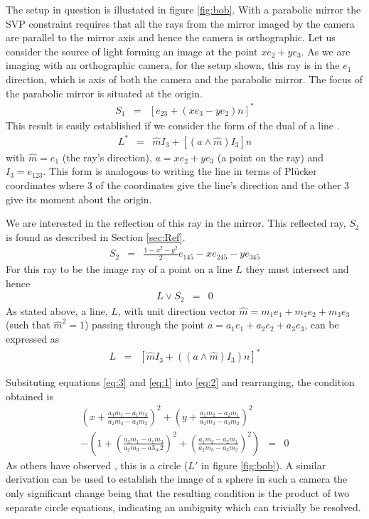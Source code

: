 The setup in question is illustated in figure \ref{fig:bob}. With a parabolic
mirror the SVP constraint requires that all the rays from the mirror imaged by
the camera are parallel to the mirror axis and hence the camera is
orthographic. Let us consider the source of light forming an image at the point
$xe_2 + ye_3$.  As we are imaging with an orthographic camera, for the setup
shown, this ray is in the $e_1$ direction, which is axis of both the camera and the parabolic mirror.  The focus of the parabolic mirror is situated at the origin. 
\begin{eqnarray}  
S_1&=& \left[e_{23} + (xe_3 - ye_2)n\right]^* \nonumber
\end{eqnarray} 
This result is easily established if we consider the form of the dual of a line \cite{cgwcga}.
\begin{eqnarray}
L^* &=&	\hat{m}I_3 + [(a\wedge \hat{m})I_3]n\nonumber
\end{eqnarray}
with $\hat{m} = e_1$ (the ray's direction), $a = xe_2 + ye_3$ (a point on the ray) and $I_3 = e_{123}$.
This form is analogous to writing the line in terms of Pl\"{u}cker coordinates where 3 of the coordinates give the line's direction and the other 3 give its moment about the origin.



We are interested in the reflection of this ray in the mirror.  This reflected ray, $S_2$ is found as
described in Section \ref{sec:Ref}.  
\begin{eqnarray} 
\label{eq:1} 
S_2 &=& \frac{1-x^2-y^2}2e_{145} -xe_{245} - y e_{345} 
\end{eqnarray}  
For this ray to be the image ray of a point on a line $L$ they must intersect and hence
\begin{eqnarray} 
\label{eq:2} L\vee S_2 &=& 0 
\end{eqnarray} 
As stated above, a line, $L$, with unit direction vector $\hat{m} = m_1e_1 + m_2e_2 + m_3e_3$ (such that $\hat{m}^2 = 1$) passing through the point $a = a_1e_1 + a_2e_2 + a_3e_3$, can be expressed as 
\begin{eqnarray} 
\label{eq:3} L &=& \left[\hat{m}I_3 + ((a\wedge \hat{m})I_3)n\right]^* 
\end{eqnarray} 

Subsituting equations \ref{eq:3} and \ref{eq:1} into \ref{eq:2} and rearranging, the condition obtained is 
\begin{eqnarray}
  \left(x + \frac{a_3m_1 - a_1m_3}{a_2m_3 -a_3m_2}\right)^2 + \left(y + \frac{a_1m_2 - a_2m_1}{a_2m_3 - a_3m_2}\right)^2 \nonumber&&\\- \left(1 + \left(\frac{a_3m_1 - a_1m_3}{a_2m_3 - a3_m2}\right)^2 + \left(\frac{a_1m_2 - a_2m_1}{a_2m_3 -a_3m_2}\right)^2\right) &=& 0
\end{eqnarray} 
As others have observed \cite{CAM:gd}, this is a circle ($L'$ in figure
		\ref{fig:bob}). A similar derivation can be used to establish
the image of a sphere in such a camera the only significant change being that
the resulting condition is the product of two separate circle equations,
    indicating an ambiguity which can trivially be resolved.  \nocite{CAM:bclf}

